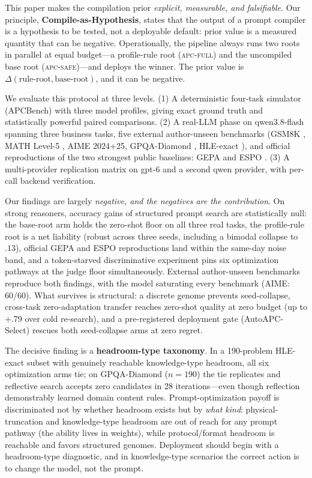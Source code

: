 \documentclass[11pt]{article}
\begin{document}
This paper makes the compilation prior \emph{explicit, measurable, and falsifiable}. Our principle, \textbf{Compile-as-Hypothesis}, states that the output of a prompt compiler is a hypothesis to be tested, not a deployable default: prior value is a measured quantity that can be negative. Operationally, the pipeline always runs two roots in parallel at equal budget---a profile-rule root (\textsc{apc-full}) and the uncompiled base root (\textsc{apc-safe})---and deploys the winner. The prior value is $\Delta(\text{rule-root}, \text{base-root})$, and it can be negative.

We evaluate this protocol at three levels. (1) A deterministic four-task simulator (APCBench) with three model profiles, giving exact ground truth and statistically powerful paired comparisons. (2) A real-LLM phase on qwen3.8-flash spanning three business tasks, five external author-unseen benchmarks (GSM8K \citep{cobbe2021training}, MATH Level-5 \citep{hendrycks2021measuring_math}, AIME 2024+25, GPQA-Diamond \citep{rein2024gpqa}, HLE-exact \citep{phan2025humanity}), and official reproductions of the two strongest public baselines: GEPA \citep{agrawal2025gepa} and ESPO \citep{espo2026}. (3) A multi-provider replication matrix on gpt-6 and a second qwen provider, with per-call backend verification.

Our findings are largely \emph{negative, and the negatives are the contribution}. On strong reasoners, accuracy gains of structured prompt search are statistically null: the base-root arm holds the zero-shot floor on all three real tasks, the profile-rule root is a net liability (robust across three seeds, including a bimodal collapse to $.13$), official GEPA and ESPO reproductions land within the same-day noise band, and a token-starved discriminative experiment pins six optimization pathways at the judge floor simultaneously. External author-unseen benchmarks reproduce both findings, with the model saturating every benchmark (AIME: 60/60). What survives is structural: a discrete genome prevents seed-collapse, cross-task zero-adaptation transfer reaches zero-shot quality at zero budget (up to $+$.79 over cold re-search), and a pre-registered deployment gate (AutoAPC-Select) rescues both seed-collapse arms at zero regret.

The decisive finding is a \textbf{headroom-type taxonomy}. In a 190-problem HLE-exact subset with genuinely reachable knowledge-type headroom, all six optimization arms tie; on GPQA-Diamond ($n{=}190$) the tie replicates and reflective search accepts zero candidates in 28 iterations---even though reflection demonstrably learned domain content rules. Prompt-optimization payoff is discriminated not by whether headroom exists but by \emph{what kind}: physical-truncation and knowledge-type headroom are out of reach for any prompt pathway (the ability lives in weights), while protocol/format headroom is reachable and favors structured genomes. Deployment should begin with a headroom-type diagnostic, and in knowledge-type scenarios the correct action is to change the model, not the prompt.
\end{document}
